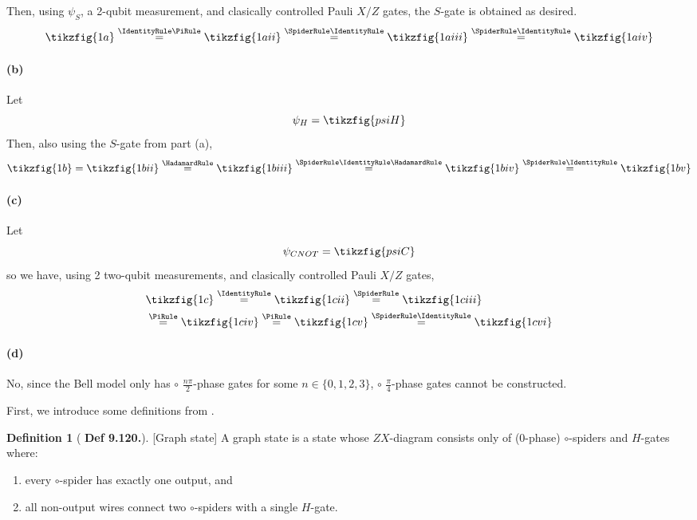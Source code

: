 \documentclass[11pt]{article} %
\theoremstyle{definition}
\newtheorem{definition}[theorem]{Definition}
\begin{document}
Then, using $\psi_S$, a 2-qubit measurement, and clasically controlled Pauli $X/Z$ gates, 
the $S$-gate is obtained as desired.
\[\tikzfig{1a}\stackrel{\IdentityRule\PiRule}{=}\tikzfig{1aii}
\stackrel{\SpiderRule\IdentityRule}{=}\tikzfig{1aiii}\stackrel{\SpiderRule\IdentityRule}{=}\tikzfig{1aiv}\]


\paragraph{(b)}
Let
\[\psi_H= \tikzfig{psiH}\]
Then, also using the $S$-gate from part (a),
\[\tikzfig{1b}=\tikzfig{1bii}\stackrel{\HadamardRule}{=}\tikzfig{1biii}
\stackrel{\SpiderRule\IdentityRule\HadamardRule}{=}\tikzfig{1biv}\stackrel{\SpiderRule\IdentityRule}{=}\tikzfig{1bv}\]

\clearpage
\paragraph{(c)}
Let
\[\psi_{CNOT}= \tikzfig{psiC}\]
so we have, using 2 two-qubit measurements, and clasically controlled Pauli $X/Z$ gates,
\begin{equation}
\begin{aligned}
&\tikzfig{1c}\stackrel{\IdentityRule}{=}\tikzfig{1cii}\stackrel{\SpiderRule}{=}\tikzfig{1ciii}\\
&\stackrel{\PiRule}{=}\tikzfig{1civ}\stackrel{\PiRule}{=}\tikzfig{1cv}
\stackrel{\SpiderRule\IdentityRule}{=}\tikzfig{1cvi}
\end{aligned}
\end{equation}

\paragraph{(d)}
No, since the Bell model only has $\circ$ $\frac{n\pi}{2}$-phase gates for some $n\in\{0,1,2,3\}$,
$\circ$ $\frac{\pi}{4}$-phase gates cannot be constructed.

First, we introduce some definitions from \cite{coecke2017picturing}.

\begin{definition}[{\cite{coecke2017picturing} \textbf{Def 9.120.}}][Graph state]
A graph state is a state whose $ZX$-diagram consists only of (0-phase) $\circ$-spiders and $H$-gates where:
\begin{enumerate}
    \item every $\circ$-spider has exactly one output, and
    \item all non-output wires connect two $\circ$-spiders with a single $H$-gate.
\end{enumerate}
\label{def:1}
\end{definition}
\end{document}
